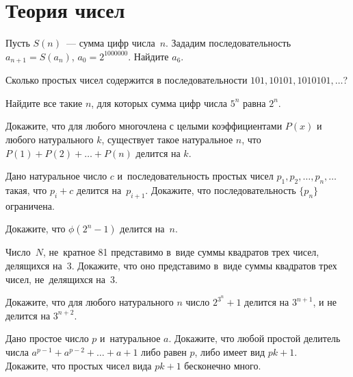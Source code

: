 
\section*{Теория чисел}


\begin{problems}

\item
Пусть $S(n)$~--- сумма цифр числа~$n$.
Зададим последовательность $a_{n+1} = S(a_n)$, $a_0 = 2^{1000000}$.
Найдите $a_6$.

\item
Сколько простых чисел содержится в последовательности
$101, 10101, 1010101, \ldots$?

\item
Найдите все такие $n$, для которых сумма цифр числа $5^n$ равна $2^n$.

\item
Докажите, что для любого многочлена с целыми коэффициентами $P(x)$ и любого
натурального $k$, существует такое натуральное $n$, что
$P(1) + P(2) + \ldots + P(n)$ делится на $k$.

\item
Дано натуральное число $c$ и~последовательность простых чисел
$p_1, p_2, \ldots, p_n, \ldots$ такая, что $p_i + c$ делится на~$p_{i+1}$.
Докажите, что последовательность $\{p_n\}$ ограничена.

\item
Докажите, что $\phi(2^n - 1)$ делится на~$n$.

\item
Число~$N$, не~кратное 81 представимо в~виде суммы квадратов трех чисел,
делящихся на~3.
Докажите, что оно представимо в~виде суммы квадратов трех чисел, не~делящихся
на~3.

\item
Докажите, что для любого натурального $n$ число $2^{3^n} + 1$ делится
на $3^{n+1}$, и не делится на $3^{n+2}$.

\item
\subproblem
Дано простое число $p$ и~натуральное $a$.
Докажите, что любой простой делитель числа $a^{p-1} + a^{p-2} + \ldots + a + 1$
либо равен $p$, либо имеет вид $p k + 1$.
\\
\subproblem
Докажите, что простых чисел вида $p k + 1$ бесконечно много.

\end{problems}

